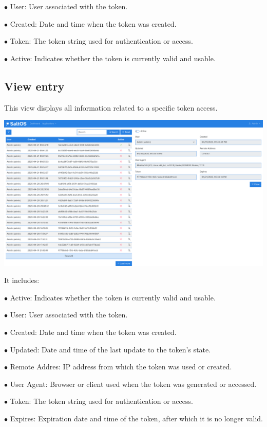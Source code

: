 \documentclass[a4paper]{article}
\begin{document}
\begin{compactitem}
\item[\color{myblue}$\bullet$] User: User associated with the token.
\item[\color{myblue}$\bullet$] Created: Date and time when the token was created.
\item[\color{myblue}$\bullet$] Token: The token string used for authentication or access.
\item[\color{myblue}$\bullet$] Active: Indicates whether the token is currently valid and usable.
\end{compactitem}

\hypertarget{toc29}{}
\subsection{View entry}

This view displays all information related to a specific token access.

\begin{center}\includegraphics[width=1\textwidth]{../ujest/snaps/test-screenshots-js-screenshots-common-tokenslog-view-1-en-us-1-snap.png}\end{center}

It includes:

\begin{compactitem}
\item[\color{myblue}$\bullet$] Active: Indicates whether the token is currently valid and usable.
\item[\color{myblue}$\bullet$] User: User associated with the token.
\item[\color{myblue}$\bullet$] Created: Date and time when the token was created.
\item[\color{myblue}$\bullet$] Updated: Date and time of the last update to the token's state.
\item[\color{myblue}$\bullet$] Remote Addres: IP address from which the token was used or created.
\item[\color{myblue}$\bullet$] User Agent: Browser or client used when the token was generated or accessed.
\item[\color{myblue}$\bullet$] Token: The token string used for authentication or access.
\item[\color{myblue}$\bullet$] Expires: Expiration date and time of the token, after which it is no longer valid.
\end{compactitem}
\end{document}

